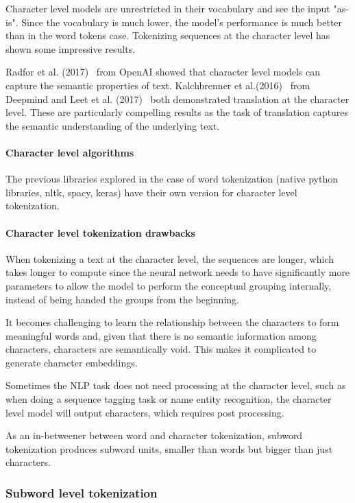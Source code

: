 Character level models are unrestricted in their vocabulary and see the input "as-is". Since the vocabulary is much lower, the model's performance is much better than in the word tokens case. Tokenizing sequences at the character level has shown some impressive results.

Radfor et al. (2017)~\cite{radford2017learning} from OpenAI showed that character level models can capture the semantic properties of text. Kalchbrenner et al.(2016)~\cite{kalchbrenner2016neural} from Deepmind and Leet et al. (2017)~\cite{lee-etal-2017-fully} both demonstrated translation at the character level. These are particularly compelling results as the task of translation captures the semantic understanding of the underlying text.

\paragraph{Character level algorithms}

The previous libraries explored in the case of word tokenization (native python libraries, nltk, spacy, keras) have their own version for character level tokenization.

\paragraph{Character level tokenization drawbacks}

When tokenizing a text at the character level, the sequences are longer, which takes longer to compute since the neural network needs to have significantly more parameters to allow the model to perform the conceptual grouping internally, instead of being handed the groups from the beginning.

It becomes challenging to learn the relationship between the characters to form meaningful words and, given that there is no semantic information among characters, characters are semantically void. This makes it complicated to generate character embeddings.

Sometimes the NLP task does not need processing at the character level, such as when doing a sequence tagging task or name entity recognition, the character level model will output characters, which requires post processing.

As an in-betweener between word and character tokenization, subword tokenization produces subword units, smaller than words but bigger than just characters.

\subsubsection{Subword level tokenization}

